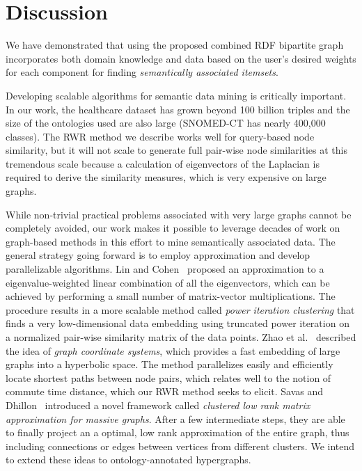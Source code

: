 \section{Discussion}
\label{sec:discussion}
We have demonstrated that using the proposed combined RDF bipartite graph incorporates both domain knowledge and data based on the user's desired weights for each component for finding \emph{semantically associated itemsets}.

Developing scalable algorithms for semantic data mining is critically important. In our work, the healthcare dataset has grown beyond 100 billion triples and the size of the ontologies used are also large (SNOMED-CT has nearly 400,000 classes). The RWR method we describe works well for query-based node similarity, but it will not scale to generate full pair-wise node similarities at this tremendous scale because a calculation of eigenvectors of the Laplacian is required to derive the similarity measures, which is very expensive on large graphs.

While non-trivial practical problems associated with very large graphs cannot be completely avoided, our work makes it possible to leverage decades of work on graph-based methods in this effort to mine semantically associated data. The general strategy going forward is to employ approximation and develop parallelizable algorithms. Lin and Cohen~\cite{LinEtal2010ICML} proposed an approximation to a eigenvalue-weighted linear combination of all the eigenvectors, which can be achieved by performing a small number of matrix-vector multiplications.  The procedure results in a more scalable method called \emph{power iteration clustering} that finds a very low-dimensional data embedding using truncated power iteration on a normalized pair-wise similarity matrix of the data points. Zhao et al.~\cite{ZhaoEtal2011Eff} described the idea of \emph{graph coordinate systems}, which provides a fast embedding of large graphs into a hyperbolic space. The method parallelizes easily and efficiently locate shortest paths between node pairs, which relates well to the notion of commute time distance, which our RWR method seeks to elicit. Savas and Dhillon~\cite{SavasEtal2011Clu} introduced a novel framework called \emph{clustered low rank matrix approximation for massive graphs}. After a few intermediate steps, they are able to finally project an a optimal, low rank approximation of the entire graph, thus including connections or edges between vertices from different clusters. We intend to extend these ideas to ontology-annotated hypergraphs.

